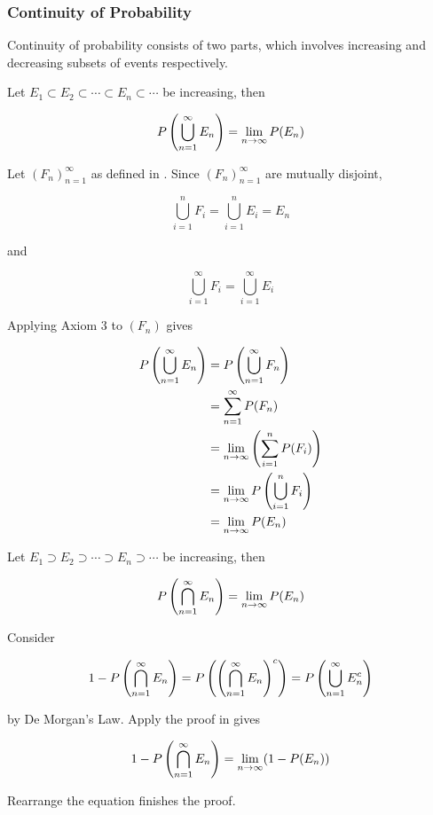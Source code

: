 \documentclass[a4paper,12pt]{article}
\begin{document}
\subsubsection{Continuity of Probability}
Continuity of probability consists of two parts, which involves increasing and decreasing subsets of events respectively.
\begin{pst}
  Let $E_{1}\subset E_{2}\subset\cdots\subset E_{n}\subset\cdots$ be increasing, then

  $$P\left( \bigcup_{n=1}^{\infty}E_{n}\right)=\lim_{n\to\infty}P(E_{n})$$\s

  \prf Let $(F_{n})_{n=1}^{\infty}$ as defined in . Since $(F_{n})_{n=1}^{\infty}$ are mutually disjoint,

  $$\bigcup_{i=1}^{n}F_{i}=\bigcup_{i=1}^{n}E_{i}=E_{n}$$\s

  and

  $$\bigcup_{i=1}^{\infty}F_{i}=\bigcup_{i=1}^{\infty}E_{i}$$\s

  Applying Axiom $3$ to $(F_{n})$ gives

  $$\begin{aligned}[t]
    P\left( \bigcup_{n=1}^{\infty}E_{n}\right)&=P\left( \bigcup_{n=1}^{\infty}F_{n}\right)\\
    &=\sum_{n=1}^{\infty}P(F_{n})\\
    &=\lim_{n\to\infty}\left( \sum_{i=1}^{n}P(F_{i})\right)\\
    &=\lim_{n\to\infty}P\left( \bigcup_{i=1}^{n}F_{i}\right)\\
    &=\lim_{n\to\infty}P(E_{n})
  \end{aligned}$$
\end{pst}\n

\begin{pst}
  Let $E_{1}\supset E_{2}\supset\cdots\supset E_{n}\supset\cdots$ be increasing, then

  $$P\left( \bigcap_{n=1}^{\infty}E_{n}\right)=\lim_{n\to\infty}P(E_{n})$$\s
  
  \prf Consider

  $$1-P\left( \bigcap_{n=1}^{\infty}E_{n}\right)=P\left( \left( \bigcap_{n=1}^{\infty}E_{n}\right)^{c}\right)=P\left( \bigcup_{n=1}^{\infty}E_{n}^{c}\right)$$\s

  by De Morgan's Law. Apply the proof in \rpst[\sctd{1}] gives

  $$1-P\left( \bigcap_{n=1}^{\infty}E_{n}\right)=\lim_{n\to\infty}(1-P(E_{n}))$$\s

  Rearrange the equation finishes the proof.
\end{pst}
\end{document}
